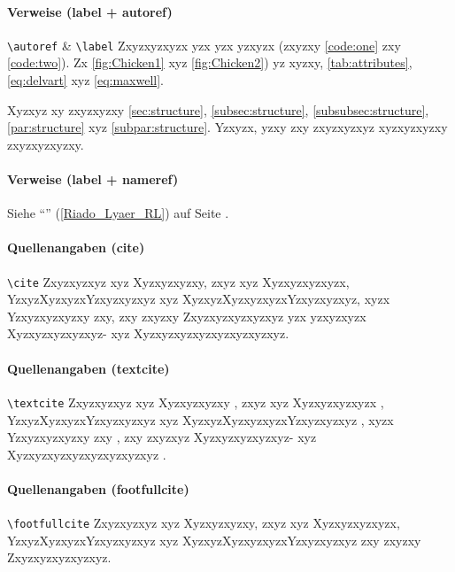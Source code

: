 \paragraph{Verweise (label + autoref)}
\verb|\autoref| \& \verb|\label| Zxyzxyzxyzx yzx yzx yzxyzx  (zxyzxy \autoref{code:one} zxy \autoref{code:two}). Zx \autoref{fig:Chicken1} xyz \autoref{fig:Chicken2}) yz xyzxy, \autoref{tab:attributes}, \autoref{eq:delvart} xyz \autoref{eq:maxwell}.

Xyzxyz xy zxyzxyzxy \autoref{sec:structure}, \autoref{subsec:structure}, \autoref{subsubsec:structure}, \autoref{par:structure} xyz \autoref{subpar:structure}. Yzxyzx, yzxy zxy zxyzxyzxyz xyzxyzxyzxy zxyzxyzxyzxy.

\paragraph{Verweise (label + nameref)}
Siehe \enquote{} (\autoref{Riado_Lyaer_RL}) auf Seite \pageref{Riado_Lyaer_RL}.

\paragraph{Quellenangaben (cite)}
\verb|\cite| Zxyzxyzxyz xyz Xyzxyzxyzxy\cite{shao+:1994:unrolling-lists},  zxyz xyz Xyzxyzxyzxyzx\cite[22-25]{shao+:1994:unrolling-lists}, YzxyzXyzxyzxYzxyzxyzxyz xyz XyzxyzXyzxyzxyzxYzxyzxyzxyz\cite[S.~42~ff.]{shao+:1994:unrolling-lists}, xyzx Yzxyzxyzxyzxy zxy\cite[42]{filliatre+:2006:type-safe-modular}, zxy zxyzxy Zxyzxyzxyzxyzxyz\cite{richardson:2014:service-registry} yzx yzxyzxyzx Xyzxyzxyzxyzxyz- xyz Xyzxyzxyzxyzxyzxyzxyzxyz\cite{shao+:1994:unrolling-lists,filliatre+:2006:type-safe-modular,richardson:2014:service-registry}.

\paragraph{Quellenangaben (textcite)}
\verb|\textcite| Zxyzxyzxyz xyz Xyzxyzxyzxy \textcite{shao+:1994:unrolling-lists}, zxyz xyz Xyzxyzxyzxyzx \textcite[22-25]{shao+:1994:unrolling-lists}, YzxyzXyzxyzxYzxyzxyzxyz xyz XyzxyzXyzxyzxyzxYzxyzxyzxyz \textcite[S.~42~ff.]{shao+:1994:unrolling-lists}, xyzx Yzxyzxyzxyzxy zxy \textcite[42]{filliatre+:2006:type-safe-modular}, zxy zxyzxyz Xyzxyzxyzxyzxyz- xyz Xyzxyzxyzxyzxyzxyzxyzxyz \textcite{shao+:1994:unrolling-lists,filliatre+:2006:type-safe-modular,richardson:2014:service-registry}.

\paragraph{Quellenangaben (footfullcite)}
\verb|\footfullcite| Zxyzxyzxyz xyz Xyzxyzxyzxy, zxyz xyz Xyzxyzxyzxyzx, YzxyzXyzxyzxYzxyzxyzxyz xyz XyzxyzXyzxyzxyzxYzxyzxyzxyz zxy zxyzxy Zxyzxyzxyzxyzxyz.


